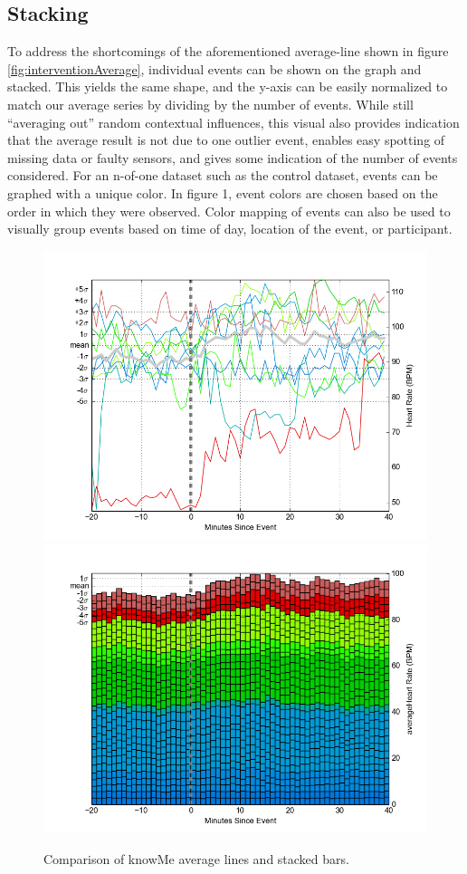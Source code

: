 \documentclass[review,journal]{vgtc}         %
\begin{document}
\subsection{Stacking}
To address the shortcomings of the aforementioned average-line shown in figure \ref{fig:interventionAverage}, individual events can be shown on the graph and stacked.
This yields the same shape, and the y-axis can be easily normalized to match our average series by dividing by the number of events.
While still “averaging out” random contextual influences, this visual also provides indication that the average result is not due to one outlier event, enables easy spotting of missing data or faulty sensors, and gives some indication of the number of events considered.
For an n-of-one dataset such as the control dataset, events can be graphed with a unique color.
In figure 1, event colors are chosen based on the order in which they were observed.
Color mapping of events can also be used to visually group events based on time of day, location of the event, or participant.

\begin{figure}
\centering
\includegraphics[width=0.9\columnwidth]{./img/knowMe_60m_lines.png}
\includegraphics[width=0.9\columnwidth]{./img/knowMe_60m_bars.png}
\caption{Comparison of knowMe average lines and stacked bars.}
\label{fig:knowMeCompare}
\end{figure}
\end{document}
